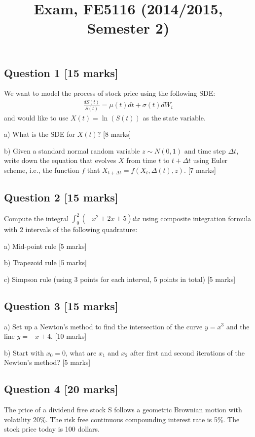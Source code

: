 \documentclass[11pt,a4paper,hidelinks,fleqn]{article}            %
\title{\vspace{-5ex}Exam, FE5116 (2014/2015, Semester 2)\vspace{-7ex}}
\date{}
\begin{document}
\maketitle
\subsection*{Question 1 [15 marks]} 
We want to model the process of stock price using the following SDE:
\begin{align*}
\frac{dS(t)}{S(t)} = \mu(t) dt + \sigma(t) dW_t
\end{align*}
and would like to use $X(t) = \ln(S(t))$ as the state variable.

a) What is the SDE for $X(t)$? [8 marks]
\vspace{4.5cm}

b) Given a standard normal random variable $z \sim N(0, 1)$ 
and time step $\Delta t$,
write down the equation that evolves $X$ from 
time $t$ to $t+\Delta t$ using Euler scheme, i.e., 
the function $f$ that $X_{t+\Delta t} = f(X_t, \Delta(t), z)$. [7 marks]

\newpage

\subsection*{Question 2 [15 marks]} 
Compute the integral $\int_0^2 (-x^2+2x+5) dx$ using composite integration formula with 2 intervals of the following quadrature:

a) Mid-point rule [5 marks]
\vspace{2cm}

b) Trapezoid rule [5 marks]
\vspace{2cm}

c) Simpson rule (using 3 points for each interval, 5 points in total) [5 marks]
\vspace{2cm}

\subsection*{Question 3 [15 marks]} 
a) Set up a Newton's method to find the intersection of the curve $y=x^3$ and the line $y = - x + 4$. [10 marks]
\vspace{4cm}

b) Start with $x_0 = 0$, what are $x_1$ and $x_2$ after first and second iterations of the Newton's method? [5 marks]

\newpage
\subsection*{Question 4 [20 marks]}
The price of a dividend free stock S follows a geometric Brownian motion with volatility 20\%.
The risk free continuous compounding interest rate is 5\%. The stock price today is 100 dollars.
\end{document}
